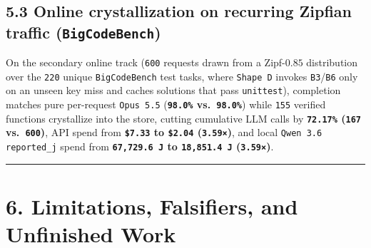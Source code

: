 \documentclass[10pt,letterpaper]{article}
\begin{document}
\subsection{\texorpdfstring{5.3 Online crystallization on recurring
Zipfian traffic
(\texttt{BigCodeBench})}{5.3 Online crystallization on recurring Zipfian traffic (BigCodeBench)}}\label{online-crystallization-on-recurring-zipfian-traffic-bigcodebench}

On the secondary online track (\texttt{600} requests drawn from a
Zipf-\(0.85\) distribution over the \texttt{220} unique
\texttt{BigCodeBench} test tasks, where \texttt{Shape\ D} invokes
\texttt{B3}/\allowbreak{}\texttt{B6} only on an unseen key miss and caches solutions
that pass \texttt{unittest}), completion matches pure per-request
\texttt{Opus\ 5.5} (\textbf{\texttt{98.0\%} vs.~\texttt{98.0\%}}) while
\texttt{155} verified functions crystallize into the store, cutting
cumulative LLM calls by \textbf{\texttt{72.17\%} (\texttt{167}
vs.~\texttt{600})}, API spend from \textbf{\texttt{\$7.33} to
\texttt{\$2.04} (\texttt{3.59×})}, and local \texttt{Qwen\ 3.6}
\texttt{reported\_\allowbreak{}j} spend from \textbf{\texttt{67,\allowbreak{}729.\allowbreak{}6\ J} to
\texttt{18,\allowbreak{}851.\allowbreak{}4\ J} (\texttt{3.59×})}.

\begin{center}\rule{0.5\linewidth}{0.5pt}\end{center}

\section{6. Limitations, Falsifiers, and Unfinished
Work}\label{limitations-falsifiers-and-unfinished-work}
\end{document}
